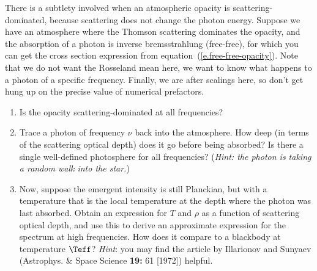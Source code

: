 \begin{exercisebox}
There is a subtlety involved when an atmospheric opacity is scattering-dominated, because scattering does not change the photon energy. Suppose we have an atmosphere where the Thomson scattering dominates the opacity, and the absorption of a photon is inverse bremsstrahlung (free-free), for which you can get the cross section expression from equation~(\ref{e.free-free-opacity}).  Note that we do not want the Rosseland mean here, we want to know what happens to a photon of a specific frequency. Finally, we are after scalings here, so don't get hung up on the precise value of numerical prefactors.
\begin{enumerate}
\item Is the opacity scattering-dominated at all frequencies?
\item Trace a photon of frequency $\nu$ back into the atmosphere.  How deep (in terms of the scattering optical depth) does it go before being absorbed? Is there a single well-defined photosphere for all frequencies? (\emph{Hint: the photon is taking a random walk into the star.})
\item Now, suppose the emergent intensity is still Planckian, but with a temperature that is the local temperature at the depth where the photon was last absorbed. Obtain an expression for $T$ and $\rho$ as a function of scattering optical depth, and use this to derive an approximate expression for the spectrum at high frequencies.  How does it compare to a blackbody at temperature $\Teff$?
\emph{Hint}: you may find the article by Illarionov and Sunyaev (Astrophys. \& Space Science \textbf{19:} 61 [1972]) helpful.
\end{enumerate}
\end{exercisebox}

